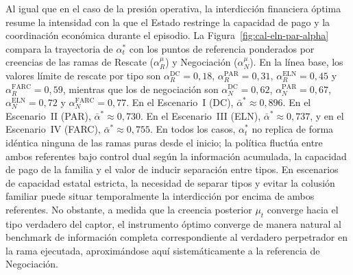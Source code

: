 \documentclass[pdflatex,sn-mathphys-ay]{sn-jnl}
\theoremstyle{thmstyleone}
\theoremstyle{thmstyletwo}
\theoremstyle{thmstylethree}
\newcommand{\1}{\mathbf{1}}
\begin{document}
Al igual que en el caso de la presión operativa, la interdicción financiera óptima resume la intensidad con la que el Estado restringe la capacidad de pago y la coordinación económica durante el episodio. La Figura~\ref{fig:cal-eln-par-alpha} compara la trayectoria de $\alpha_t^\ast$ con los puntos de referencia ponderados por creencias de las ramas de Rescate ($\alpha_R^\mu$) y Negociación ($\alpha_N^\mu$). En la línea base, los valores límite de rescate por tipo son $\alpha_R^{\mathrm{DC}}=0{,}18$, $\alpha_R^{\mathrm{PAR}}=0{,}31$, $\alpha_R^{\mathrm{ELN}}=0{,}45$ y $\alpha_R^{\mathrm{FARC}}=0{,}59$, mientras que los de negociación son $\alpha_N^{\mathrm{DC}}=0{,}62$, $\alpha_N^{\mathrm{PAR}}=0{,}67$, $\alpha_N^{\mathrm{ELN}}=0{,}72$ y $\alpha_N^{\mathrm{FARC}}=0{,}77$. En el Escenario~I (DC), $\bar\alpha^\ast\approx 0{,}896$. En el Escenario~II (PAR), $\bar\alpha^\ast\approx 0{,}730$. En el Escenario~III (ELN), $\bar\alpha^\ast\approx 0{,}737$, y en el Escenario~IV (FARC), $\bar\alpha^\ast\approx 0{,}755$. En todos los casos, $\alpha_t^\ast$ no replica de forma idéntica ninguna de las ramas puras desde el inicio; la política fluctúa entre ambos referentes bajo control dual según la información acumulada, la capacidad de pago de la familia y el valor de inducir separación entre tipos. En escenarios de capacidad estatal estricta, la necesidad de separar tipos y evitar la colusión familiar puede situar temporalmente la interdicción por encima de ambos referentes. No obstante, a medida que la creencia posterior $\mu_t$ converge hacia el tipo verdadero del captor, el instrumento óptimo converge de manera natural al benchmark de información completa correspondiente al verdadero perpetrador en la rama ejecutada, aproximándose aquí sistemáticamente a la referencia de Negociación.
\end{document}
